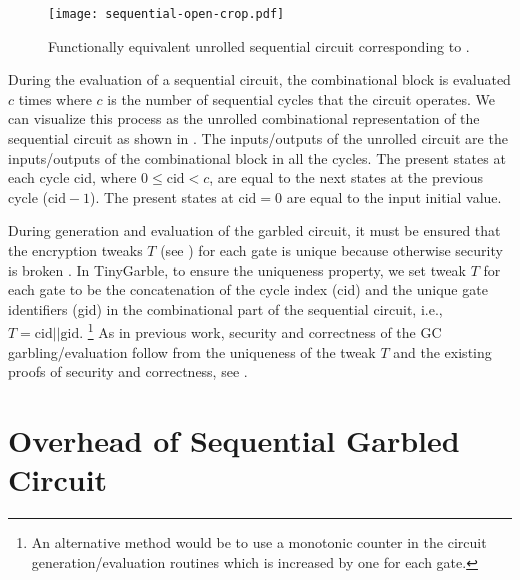 \begin{figure}[t]
    \centering
	\texttt{[image: sequential-open-crop.pdf]}
	\caption{Functionally equivalent unrolled sequential circuit corresponding to .}
	\label{fig:open-sequential}
\end{figure}

During the evaluation of a sequential circuit, the combinational block is evaluated $c$ times where $c$ is the number of sequential cycles that the circuit operates.
We can visualize this process as the unrolled combinational representation of the sequential circuit as shown in .
The inputs/outputs of the unrolled circuit are the inputs/outputs of the combinational block in all the cycles.
The present states at each cycle $\textrm{cid}$, where $0 \le \textrm{cid} < c$, are equal to the next states at the previous cycle ($\textrm{cid}-1$).
The present states at $\textrm{cid}=0$ are equal to the input initial value.

During generation and evaluation of the garbled circuit, it must be ensured that the encryption tweaks $T$ (see ) for each gate is unique because otherwise security is broken \cite[Sect. 3.4]{henecka2013faster}.
In TinyGarble, to ensure the uniqueness property, we set tweak $T$ for each gate to be the concatenation of the cycle index (cid) and the unique gate identifiers (gid) in the combinational part of the sequential circuit, i.e., $T = \textrm{cid} || \textrm{gid}$.
\footnote{An alternative method would be to use a monotonic counter in the circuit generation/evaluation routines which is increased by one for each gate.}
As in previous work, security and correctness of the GC garbling/evaluation follow from the uniqueness of the tweak $T$ and the existing proofs of security and correctness, see \cite{lindell2009proof,bellare2013efficient}.

\section{Overhead of Sequential Garbled Circuit}

